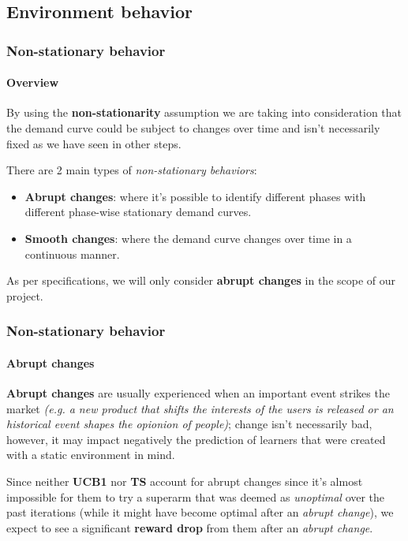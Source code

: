\documentclass[11pt]{beamer}
\begin{document}

\subsection{Environment behavior}


\begin{frame}
\frametitle{Non-stationary behavior}
\framesubtitle{Overview}

By using the \textbf{non-stationarity} assumption we are taking into consideration that the demand curve could be subject to changes over time and isn't necessarily fixed as we have seen in other steps.

There are 2 main types of \textit{non-stationary behaviors}:
\begin{itemize}[label={$\circ$}]
    \item \textbf{Abrupt changes}: where it's possible to identify different phases with different phase-wise stationary demand curves.
    \item \textbf{Smooth changes}: where the demand curve changes over time in a continuous manner.
\end{itemize}

As per specifications, we will only consider \textbf{abrupt changes} in the scope of our project.

\end{frame}


\begin{frame}
\frametitle{Non-stationary behavior}
\framesubtitle{Abrupt changes}

\textbf{Abrupt changes} are usually experienced when an important event strikes the market \textit{(e.g. a new product that shifts the interests of the users is released or an historical event shapes the opionion of people)}; change isn't necessarily bad, however, it may impact negatively the prediction of learners that were created with a static environment in mind.

Since neither \textbf{UCB1} nor \textbf{TS} account for abrupt changes since it's almost impossible for them to try a superarm that was deemed as \textit{unoptimal} over the past iterations (while it might have become optimal after an \textit{abrupt change}), we expect to see a significant \textbf{reward drop} from them after an \textit{abrupt change}.

\end{frame}
\end{document}
